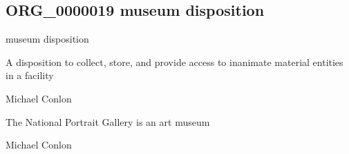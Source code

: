 \documentclass[letterpaper,10pt,english]{sphinxmanual}
\begin{document}
\subsection{ORG\_0000019 \sphinxhyphen{} museum disposition}
\label{\detokenize{doc-ORG_0000019:org-0000019-museum-disposition}}\label{\detokenize{doc-ORG_0000019:index-0}}\label{\detokenize{doc-ORG_0000019::doc}}
\begin{sphinxShadowBox}

\sphinxAtStartPar
museum disposition
\end{sphinxShadowBox}

\begin{sphinxShadowBox}

\sphinxAtStartPar
{\hyperref[\detokenize{doc-BFO_0000016::doc}]{}}
\end{sphinxShadowBox}

\begin{sphinxShadowBox}

\sphinxAtStartPar
A disposition to collect, store, and provide access to inanimate material entities in a facility
\end{sphinxShadowBox}

\begin{sphinxShadowBox}

\sphinxAtStartPar
Michael Conlon 
\end{sphinxShadowBox}

\begin{sphinxShadowBox}

\sphinxAtStartPar
The National Portrait Gallery is an art museum
\end{sphinxShadowBox}

\begin{sphinxShadowBox}

\sphinxAtStartPar
Michael Conlon 
\end{sphinxShadowBox}
\begin{quote}

\ignorespaces \end{quote}
\end{document}
